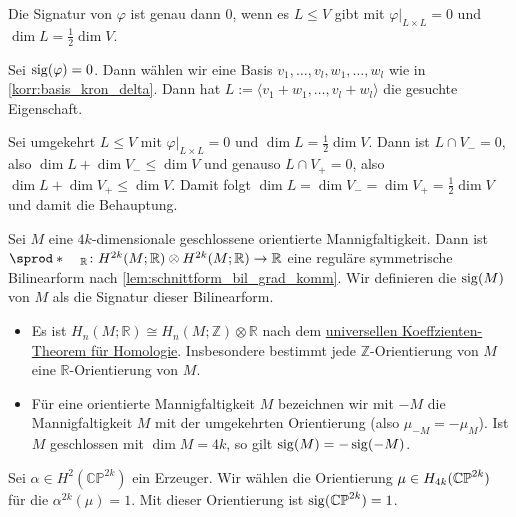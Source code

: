 \begin{lemma}[label=sig_null,{name=[{Äquivalenz dazu, dass die Signatur 0 ist}]}]
	Die Signatur von $\varphi$ ist genau dann $0$, wenn es $L \le V$ gibt mit $\varphi|_{L \times L}=0$ und $\dim L = \frac{1}{2} \dim V$.
\end{lemma}
\begin{beweis}
	Sei $\operatorname{sig}(\varphi)=0$. Dann wählen wir eine Basis $v_1,\ldots ,v_l,w_1,\ldots ,w_l$ wie in \autoref{korr:basis_kron_delta}.
	Dann hat $L := \langle v_1+ w_1, \ldots ,v_l+w_l\rangle$ die gesuchte Eigenschaft.
	
	Sei umgekehrt $L \le V$ mit $\varphi|_{L \times L}=0$ und $\dim L = \frac{1}{2} \dim V$.
	Dann ist $L \cap V_- =0$, also $\dim L + \dim V_- \le \dim V$ und genauso $L \cap V_+ =0$, also $\dim L + \dim V_+ \le \dim V$.
	Damit folgt $\dim L = \dim V_- = \dim V_+ = \frac{1}{2} \dim V$ und damit die Behauptung.
\end{beweis}

\begin{definition}[{name=[Signatur einer Mannigfaltigkeit]}]
	Sei $M$ eine $4k$-dimensionale geschlossene orientierte Mannigfaltigkeit.
	Dann ist $\sprod*{\enspace}{\enspace}_\mathbb{R} \colon H^{2k}(M;\mathbb{R}) \otimes H^{2k}(M;\mathbb{R}) \to \mathbb{R}$ eine reguläre symmetrische Bilinearform nach \autoref{lem:schnittform_bil_grad_komm}.
	Wir definieren die  $\operatorname{sig}(M)$ von $M$ als die Signatur dieser Bilinearform.
\end{definition}

\begin{bemerkung}[{name=[{über reelle Koeffizienten}]}]
	\leavevmode
	\begin{itemize}
		\item Es ist $H_n(M;\mathbb{R}) \cong H_n(M;\mathbb{Z})\otimes \mathbb{R}$ nach dem \hyperref[satz:univ_koeff_homo_space]{universellen Koeffzienten-Theorem für Homologie}.
		Insbesondere bestimmt jede $\mathbb{Z}$-Orientierung von $M$ eine $\mathbb{R}$-Orientierung von $M$.
		\item Für eine orientierte Mannigfaltigkeit $M$ bezeichnen wir mit $-M$ die Mannigfaltigkeit $M$ mit der umgekehrten Orientierung (also $\mu_{-M}=-\mu_M$).
		Ist $M$ geschlossen mit $\dim M = 4k$, so gilt $\operatorname{sig}(M)=- \operatorname{sig}(-M)$.
	\end{itemize}
\end{bemerkung}

\begin{beispiel}[{name=[{Signatur des komplex projektiven Raumes}]}]
	Sei $\alpha \in H^2(\mathbb{CP}^{2k})$ ein Erzeuger.
	Wir wählen die Orientierung $\mu \in H_{4k} (\mathbb{CP}^{2k})$ für die $\alpha^{2k} (\mu)=1$.
	Mit dieser Orientierung ist $\operatorname{sig} (\mathbb{CP}^{2k})=1$.
\end{beispiel}

